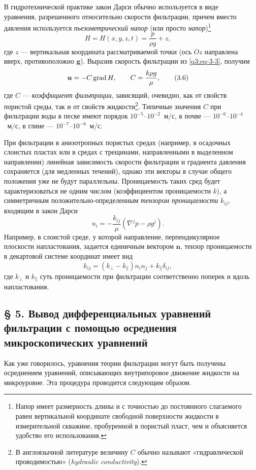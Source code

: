 В гидротехнической практике закон Дарси обычно используется в виде уравнения, разрешенного относительно скорости фильтрации, причем вместо давления используется
\textit{пьезометрический напор} (или просто \textit{напор})\setcounter{footnote}{0}\footnote{Напор имеет размерность длины и с точностью до постоянного слагаемого равен вертикальной координате свободной поверхности жидкости в измерительной скважине, пробуренной в пористый пласт, чем и объясняется удобство его использования.}
\[
H=H(x,y,z,t)=\frac{p}{\rho g}+z,
\]
где $z$ --- вертикальная координата рассматриваемой точки (ось $Oz$ направлена вверх, противоположно $\boldsymbol{g}$). Выразив скорость фильтрации из \eqref{q3:eq-3-3}, получим
\begin{equation}
\boldsymbol{u}=-C\operatorname{grad} H,\qquad C=\frac{k\rho g}{\mu},
\tag{3.6}\label{q3:eq-3-6}
\end{equation}
где $C$ --- \textit{коэффициент фильтрации}, зависящий, очевидно, как от свойств пористой среды, так и от свойств жидкости\footnote{В англоязычной литературе величину $C$ обычно называют «гидравлической проводимостью» (\textit{hydraulic conductivity}).}. Типичные значения $C$ при фильтрации воды в песке имеют порядок $10^{-5}$--$10^{-2}$~м/с, в почве --- $10^{-6}$--$10^{-4}$~м/с, в глине --- $10^{-7}$--$10^{-6}$~м/с.

При фильтрации в анизотропных пористых средах (например, в осадочных слоистых пластах или в средах с трещинами, направленными в выделенном направлении) линейная зависимость скорости фильтрации и градиента давления сохраняется (для медленных течений), однако эти векторы в случае общего положения уже не будут параллельны. Проницаемость таких сред будет характеризоваться не одним числом (коэффициентом проницаемости $k$), а симметричным положительно-определенным \textit{тензором проницаемости} $k_{ij}$, входящим в закон Дарси
\[
u_i=-\frac{k_{ij}}{\mu}(\nabla^jp-\rho g^j).
\]
Например, в слоистой среде, у которой направление, перпендикулярное плоскости напластования, задается единичным вектором $\boldsymbol{n}$, тензор проницаемости в декартовой системе координат имеет вид
\[
k_{ij}=(k_\perp-k_\parallel)n_in_j+k_\parallel\delta_{ij},
\]
где $k_\perp$ и $k_\parallel$ суть проницаемости при фильтрации соответственно поперек и вдоль напластования.


\subsection*{§ 5. Вывод дифференциальных уравнений фильтрации с помощью осреднения микроскопических уравнений}
\label{q3:sec-5}
Как уже говорилось, уравнения теории фильтрации могут быть получены осреднением уравнений, описывающих внутрипоровое движение жидкости на микроуровне. Эта процедура проводится следующим образом.

